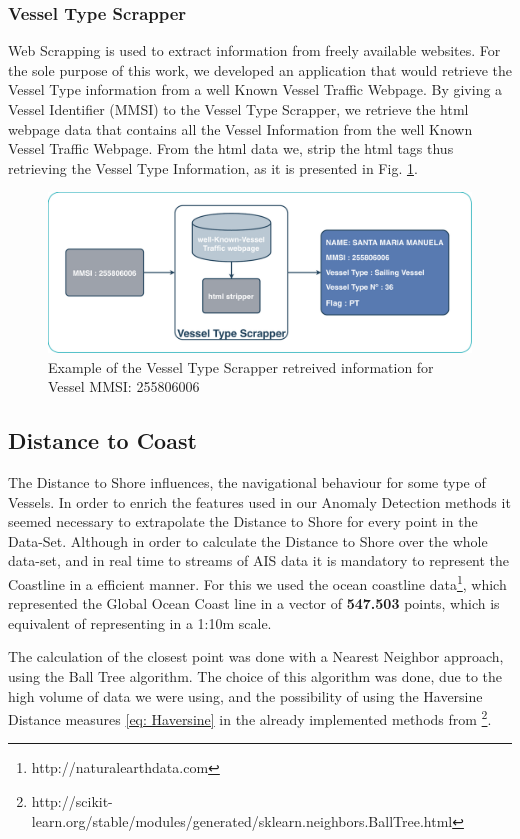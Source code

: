 \subsubsection{Vessel Type Scrapper}
Web Scrapping is used to extract information from freely available websites. For the sole purpose of this work, we developed an application that would retrieve the Vessel Type information from a well Known Vessel Traffic Webpage.
By giving a Vessel Identifier (MMSI) to the Vessel Type Scrapper, we retrieve the html webpage data that contains all the Vessel Information from the well Known Vessel Traffic Webpage. From the html data we, strip the html tags thus retrieving the Vessel Type Information, as it is presented in Fig. \ref{fig:Scraper}.

\begin{figure}[H]
	\centering
	\includegraphics[scale = .4]{figures/Ch4/scrapper}
    \caption{Example of the Vessel Type Scrapper retreived information for Vessel MMSI: 255806006}
    \label{fig:Scraper}
\end{figure}


\subsection{Distance to Coast}
The Distance to Shore influences, the navigational behaviour for some type of Vessels. In order to enrich the features used in our Anomaly Detection methods it seemed necessary to extrapolate the Distance to Shore for every point in the Data-Set. Although in order to calculate the Distance to Shore over the whole data-set, and in real time to streams of AIS data it is mandatory to represent the Coastline in a efficient manner. 
For this we used the ocean coastline data\footnote{http://naturalearthdata.com}, which represented the Global Ocean Coast line in a vector of \textbf{547.503} points, which is equivalent of representing in a 1:10m scale.

The calculation of the closest point was done with a Nearest Neighbor approach, using the Ball Tree algorithm. The choice of this algorithm was done, due to the high volume of data we were using, and the possibility of using the Haversine Distance measures \eqref{eq: Haversine} in the already implemented methods from \footnote{http://scikit-learn.org/stable/modules/generated/sklearn.neighbors.BallTree.html}.

